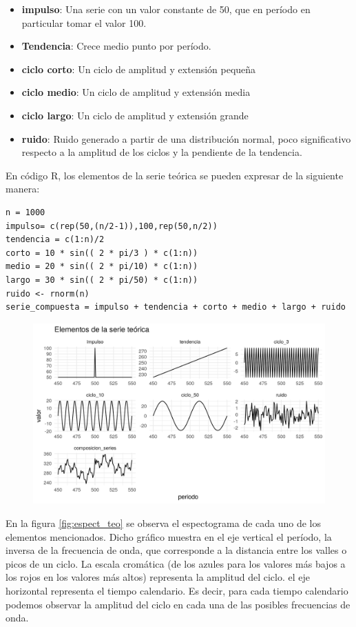 \documentclass[a4paper]{article}
\begin{document}
\begin{itemize}
	\item \textbf{impulso}: Una serie con un valor constante de 50, que en período en particular tomar el valor 100.
	\item \textbf{Tendencia}: Crece medio punto por período.
	\item \textbf{ciclo corto}: Un ciclo de amplitud y extensión pequeña
	\item \textbf{ciclo medio}: Un ciclo de amplitud y extensión media
	\item \textbf{ciclo largo}: Un ciclo de amplitud y extensión grande
	\item \textbf{ruido}: Ruido generado a partir de una distribución normal, poco significativo respecto a la amplitud de los ciclos y la pendiente de la tendencia.
\end{itemize}

En código R, los elementos de la serie teórica se pueden expresar de la siguiente manera:

\begin{lstlisting}
n = 1000
impulso= c(rep(50,(n/2-1)),100,rep(50,n/2))
tendencia = c(1:n)/2
corto = 10 * sin(( 2 * pi/3 ) * c(1:n))
medio = 20 * sin(( 2 * pi/10) * c(1:n))
largo = 30 * sin(( 2 * pi/50) * c(1:n))
ruido <- rnorm(n)
serie_compuesta = impulso + tendencia + corto + medio + largo + ruido
\end{lstlisting}


\begin{figure}[H]
	\centering
	\includegraphics[width=\linewidth]{serie_teorica.PNG}
	\caption{} \label{fig:serie_teorica}
\end{figure}

En la figura \ref{fig:espect_teo} se observa el espectograma de cada uno de los elementos mencionados. Dicho gráfico muestra en el eje vertical el período, la inversa de la frecuencia de onda, que corresponde a la distancia entre los valles o picos de un ciclo. La escala cromática (de los azules para los valores más bajos a los rojos en los valores más altos) representa la amplitud del ciclo. el eje horizontal representa el tiempo calendario. Es decir, para cada tiempo calendario podemos observar la amplitud del ciclo en cada una de las posibles frecuencias de onda. 
\end{document}
